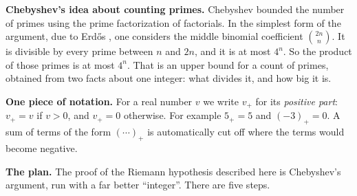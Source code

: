 \documentclass[11pt,letterpaper]{article}
\begin{document}
\textbf{Chebyshev's idea about counting primes.} Chebyshev \cite{Che52} bounded the number of primes using
the prime factorization of factorials. In the simplest form of the
argument, due to Erd\H{o}s \cite{Erd32}, one considers the middle binomial coefficient $\binom{2n}{n}$. It is
divisible by every prime between $n$ and $2n$, and it is at most $4^n$. So the product of
those primes is at most $4^n$. That is an upper bound for a count of primes, obtained from two facts about
one integer: what divides it, and how big it is.

\textbf{One piece of notation.} For a real number $v$ we write $v_+$ for its \emph{positive part}:
$v_+=v$ if $v>0$, and $v_+=0$ otherwise. For example $5_+=5$ and $(-3)_+=0$. A sum of terms of the form
$(\cdots)_+$ is automatically cut off where the terms would become negative.

\textbf{The plan.} The proof of the Riemann hypothesis described here is Chebyshev's argument, run with a far
better ``integer''. There are five steps.
\end{document}
